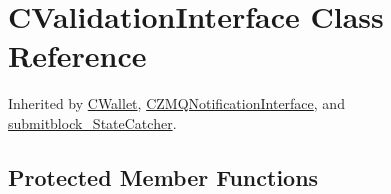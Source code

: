 \hypertarget{class_c_validation_interface}{}\section{C\+Validation\+Interface Class Reference}
\label{class_c_validation_interface}


Inherited by \mbox{\hyperlink{class_c_wallet}{C\+Wallet}}, \mbox{\hyperlink{class_c_z_m_q_notification_interface}{C\+Z\+M\+Q\+Notification\+Interface}}, and \mbox{\hyperlink{classsubmitblock___state_catcher}{submitblock\+\_\+\+State\+Catcher}}.

\subsection*{Protected Member Functions}
